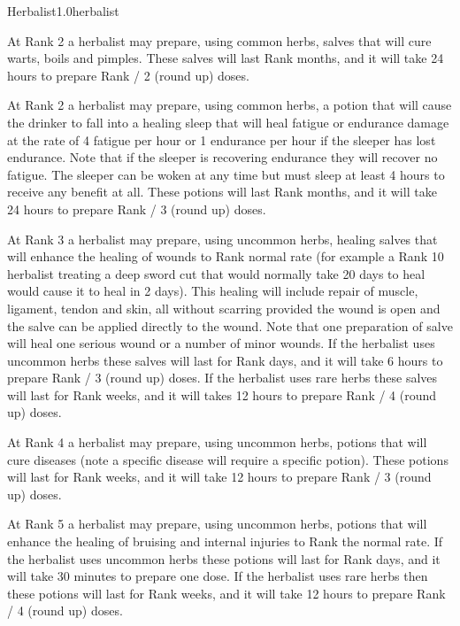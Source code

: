 \begin{skill}{Herbalist}{1.0}{herbalist}
\begin{Enumerate}
\item
At Rank 2 a herbalist may prepare, using common herbs, salves that
will cure warts, boils and pimples.  These salves will last Rank
months, and it will take 24 hours to prepare Rank / 2 (round up)
doses.

\item
At Rank 2 a herbalist may prepare, using common herbs, a potion that
will cause the drinker to fall into a healing sleep that will heal
fatigue or endurance damage at the rate of 4 fatigue per hour or 1
endurance per hour if the sleeper has lost endurance.  Note that if
the sleeper is recovering endurance they will recover no fatigue.  The
sleeper can be woken at any time but must sleep at least 4 hours to
receive any benefit at all.  These potions will last Rank months, and
it will take 24 hours to prepare Rank / 3 (round up) doses.

\item	At Rank 3 a herbalist may prepare, using uncommon herbs,
healing salves that will enhance the healing of wounds to Rank \x
normal rate (for example a Rank 10 herbalist treating a deep sword cut
that would normally take 20 days to heal would cause it to heal in 2
days).  This healing will include repair of muscle, ligament, tendon
and skin, all without scarring provided the wound is open and the salve
can be applied directly to the wound.  Note that one preparation of
salve will heal one serious wound or a number of minor wounds.  If the
herbalist uses uncommon herbs these salves will last for Rank days,
and it will take 6 hours to prepare Rank / 3 (round up) doses.  If the
herbalist uses rare herbs these salves will last for Rank weeks, and
it will takes 12 hours to prepare Rank / 4 (round up) doses.

\item	At Rank 4 a herbalist may prepare, using uncommon herbs,
potions that will cure diseases (note a specific disease will require a
specific potion).  These potions will last for Rank weeks, and it will
take 12 hours to prepare Rank / 3 (round up) doses.

\item At Rank 5 a herbalist may prepare, using uncommon herbs, potions
that will enhance the healing of bruising and internal injuries to
Rank \x the normal rate.  If the herbalist uses uncommon herbs these
potions will last for Rank days, and it will take 30 minutes to
prepare one dose.  If the herbalist uses rare herbs then these potions
will last for Rank weeks, and it will take 12 hours to prepare Rank /
4 (round up) doses.


\end{Enumerate}
\end{skill}
